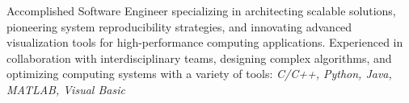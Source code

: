 \documentclass{resume} %
\begin{document}

\begin{rSection}{}
	Accomplished Software Engineer specializing in architecting scalable solutions, pioneering system reproducibility strategies, and innovating advanced visualization tools for high-performance computing applications. Experienced in collaboration with interdisciplinary teams, designing complex algorithms, and optimizing computing systems with a variety of tools: \itshape{C/C++, Python, Java, MATLAB, Visual Basic }


\end{rSection}

\end{document}
